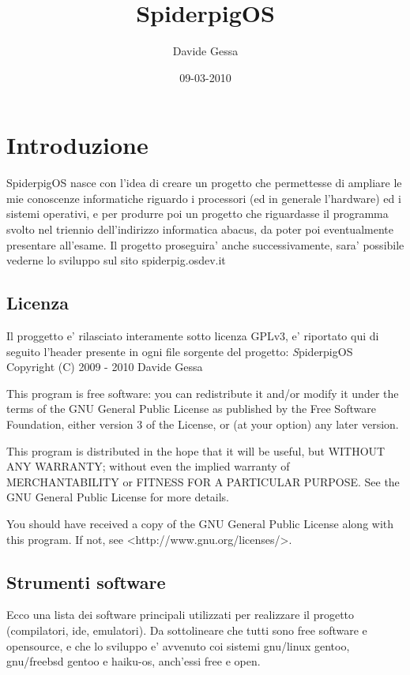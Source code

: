 \documentclass[a4paper,10pt]{book}
\title{SpiderpigOS}
\author{Davide Gessa}
\date{09-03-2010}
\begin{document}
\maketitle

\tableofcontents
\setcounter{tocdepth}{4}
\listoftables


\chapter{Introduzione}
SpiderpigOS nasce con l'idea di creare un progetto che permettesse di ampliare
le mie conoscenze informatiche riguardo i processori (ed in generale l'hardware)
ed i sistemi operativi, e per produrre poi un progetto che riguardasse il 
programma svolto nel triennio dell'indirizzo informatica abacus, da poter poi 
eventualmente presentare all'esame.
Il progetto proseguira' anche successivamente, sara' possibile vederne lo sviluppo sul sito
spiderpig.osdev.it

\section{Licenza}
Il proggetto e' rilasciato interamente sotto licenza GPLv3, e' riportato qui di seguito l'header presente
in ogni file sorgente del progetto:
\newline
\newline 
\ttfamily
\textit
    SpiderpigOS
    Copyright (C) 2009 - 2010 Davide Gessa
    
    This program is free software: you can redistribute it and/or modify
    it under the terms of the GNU General Public License as published by
    the Free Software Foundation, either version 3 of the License, or
    (at your option) any later version.

    This program is distributed in the hope that it will be useful,
    but WITHOUT ANY WARRANTY; without even the implied warranty of
    MERCHANTABILITY or FITNESS FOR A PARTICULAR PURPOSE.  See the
    GNU General Public License for more details.

    You should have received a copy of the GNU General Public License
    along with this program.  If not, see <http://www.gnu.org/licenses/>.
\rmfamily
\newline


\section{Strumenti software}
Ecco una lista dei software principali utilizzati per realizzare il progetto (compilatori, ide, emulatori).
Da sottolineare che tutti sono free software e opensource, e che lo sviluppo e' avvenuto coi sistemi 
gnu/linux gentoo, gnu/freebsd gentoo e haiku-os, anch'essi free e open.
\end{document}
